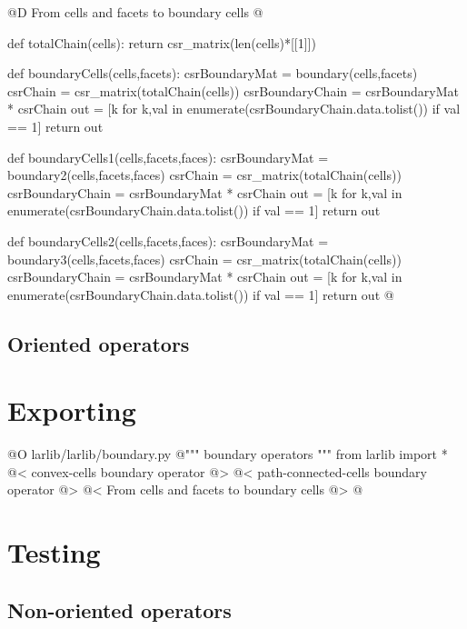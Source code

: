 \documentclass[11pt,oneside]{article}	%
\begin{document}
@D From cells and facets to boundary cells
@{def totalChain(cells):
    return csr_matrix(len(cells)*[[1]])

def boundaryCells(cells,facets):
    csrBoundaryMat = boundary(cells,facets)
    csrChain = csr_matrix(totalChain(cells))
    csrBoundaryChain = csrBoundaryMat * csrChain
    out = [k for k,val in enumerate(csrBoundaryChain.data.tolist()) if val == 1]
    return out

def boundaryCells1(cells,facets,faces):
    csrBoundaryMat = boundary2(cells,facets,faces)
    csrChain = csr_matrix(totalChain(cells))
    csrBoundaryChain = csrBoundaryMat * csrChain
    out = [k for k,val in enumerate(csrBoundaryChain.data.tolist()) if val == 1]
    return out

def boundaryCells2(cells,facets,faces):
    csrBoundaryMat = boundary3(cells,facets,faces)
    csrChain = csr_matrix(totalChain(cells))
    csrBoundaryChain = csrBoundaryMat * csrChain
    out = [k for k,val in enumerate(csrBoundaryChain.data.tolist()) if val == 1]
    return out
@}



\subsection{Oriented operators}


\section{Exporting}

@O larlib/larlib/boundary.py
@{""" boundary operators """
from larlib import *
@< convex-cells boundary operator @>
@< path-connected-cells boundary operator @>
@< From cells and facets to boundary cells @>
@}


\section{Testing}

\subsection{Non-oriented operators}
\end{document}
